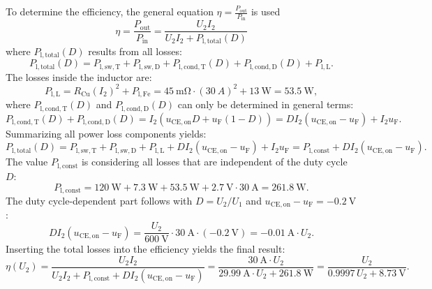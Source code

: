 \begin{solutionblock}
	To determine the efficiency, the general equation $\eta=\frac{P_{\mathrm{out}}}{P_{\mathrm{in}}}$ is used
	\begin{equation}
		\eta=\frac{P_{\mathrm{out}}}{P_{\mathrm{in}}} = \frac{U_\mathrm{2} I_\mathrm{2}}{U_\mathrm{2} I_\mathrm{2} + P_{\mathrm{l,total}}(D)}
	\end{equation}
	where $P_{\mathrm{l,total}}(D)$ results from all losses:
	\begin{equation}
		P_{\mathrm{l,total}}(D) =  P_{\mathrm{l,sw,T}} +  P_{\mathrm{l,sw,D}} + P_{\mathrm{l,cond,T}}(D) + P_{\mathrm{l,cond,D}}(D) + P_{\mathrm{l,L}}.
	\end{equation}
	The losses inside the inductor are:
	\begin{equation}
		P_{\mathrm{l,L}} = R_{\mathrm{Cu}} (I_{\mathrm{2}})^2 + P_{\mathrm{l,Fe}} = \SI{45}{\mohm} \cdot {(30\ \si{A})^2} + \SI {13}{\watt} = \SI {53.5}{\watt},
	\end{equation}
	where $P_{\mathrm{l,cond,T}}(D)$ and $P_{\mathrm{l,cond,D}}(D)$ can only be determined in general terms:
	\begin{equation}
		P_{\mathrm{l,cond,T}}(D) + P_{\mathrm{l,cond,D}}(D) = I_2( u_{\mathrm{CE,on}} D + u_{\mathrm{F}}(1-D)) = D I_\mathrm{2}(u_{\mathrm{CE,on}} - u_{\mathrm{F}} ) + I_\mathrm{2} u_{\mathrm{F}}.
	\end{equation}
	Summarizing all power loss components yields:
	\begin{equation}
		P_{\mathrm{l,total}}(D) = P_{\mathrm{l,sw,T}}  +  P_{\mathrm{l,sw,D}}  + P_{\mathrm{l,L}} + D I_\mathrm{2}(u_{\mathrm{CE,on}} - u_{\mathrm{F}} ) + I_\mathrm{2} u_{\mathrm{F}} =  P_{\mathrm{l,const}} + D I_\mathrm{2} (u_{\mathrm{CE,on}} - u_{\mathrm{F}}).
	\end{equation}
	The value $P_{\mathrm{l,const}}$ is considering all losses that are independent of the duty cycle $D$:
	\begin{equation}
		P_{\mathrm{l,const}} = \SI {120}{\watt} + \SI {7.3}{\watt} +\SI {53.5}{\watt} + \SI {2.7}{\volt}\cdot\SI {30}{\ampere} = \SI {261.8}{\watt}.
	\end{equation}
	The duty cycle-dependent part follows with $D = U_\mathrm{2}/U_\mathrm{1}$ and $u_{\mathrm{CE,on}} - u_{\mathrm{F}} = \SI{-0.2}{\volt}$:
	\begin{equation}
		D I_\mathrm{2} (u_{\mathrm{CE,on}} - u_{\mathrm{F}}) = \frac{U_\mathrm{2}}{\SI{600}{\volt}} \cdot \SI{30}{\ampere} \cdot (\SI{-0.2}{\volt}) = -\SI{0.01}{\ampere} \cdot U_\mathrm{2}.
	\end{equation}
	Inserting the total losses into the efficiency yields the final result:
	\begin{equation}
		\eta(U_\mathrm{2}) = \frac{U_\mathrm{2} I_\mathrm{2}}{U_\mathrm{2} I_\mathrm{2} + P_{\mathrm{l,const}} + D I_\mathrm{2} (u_{\mathrm{CE,on}} - u_{\mathrm{F}})}
		= \frac{\SI{30}{\ampere} \cdot U_\mathrm{2}}{\SI{29.99}{\ampere} \cdot U_\mathrm{2} + \SI{261.8}{\watt}}
		= \frac{U_\mathrm{2}}{0.9997\, U_\mathrm{2} + \SI{8.73}{\volt}}.
	\end{equation}
\end{solutionblock}

